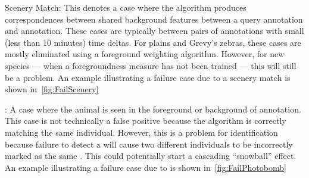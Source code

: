 \begin{itemln}

            \item Scenery Match:
            This denotes a case where the algorithm produces
              correspondences between shared background features between
              a query annotation and \aan{\groundfalse{}} annotation.
            These cases are typically between pairs of annotations with
              small (less than $10$ minutes) time deltas.
            For plains and Grevy's zebras, these cases are mostly
              eliminated using a foreground weighting algorithm.
            However, for new species --- when a foregroundness measure
              has not been trained --- this will still be a problem.
            An example illustrating a failure case due to a scenery
              match is shown in~\cref{fig:FailScenery}

              \FailScenery{}

            \item \Photobomb{}:
            A case where the \groundtrue{} animal is seen in the
              foreground or background of \aan{\groundfalse{}}
              annotation.
            This case is not technically a false positive because the
              algorithm is correctly matching the same individual.
            However, this is a problem for identification because
              failure to detect a \photobomb{} will cause two different
              individuals to be incorrectly marked as the same \name{}.
            This could potentially start a cascading ``snowball''
              effect.
            An example illustrating a failure case due to
              \photobombing{} is shown in~\cref{fig:FailPhotobomb}

              \FailPhotobomb{}

        \end{itemln}


